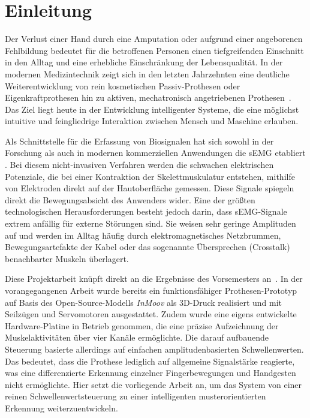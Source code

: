 \section{Einleitung}
\label{sec:einleitung}
Der Verlust einer Hand durch eine Amputation oder aufgrund einer angeborenen Fehlbildung bedeutet für die betroffenen Personen einen tiefgreifenden Einschnitt in den Alltag und eine erhebliche Einschränkung der Lebensqualität. In der modernen Medizintechnik zeigt sich in den letzten Jahrzehnten eine deutliche Weiterentwicklung von rein kosmetischen Passiv-Prothesen oder Eigenkraftprothesen hin zu aktiven, mechatronisch angetriebenen Prothesen~\cite{KellnerHandprothesen}. Das Ziel liegt heute in der Entwicklung intelligenter Systeme, die eine möglichst intuitive und feingliedrige Interaktion zwischen Mensch und Maschine erlauben.

Als Schnittstelle für die Erfassung von Biosignalen hat sich sowohl in der Forschung als auch in modernen kommerziellen Anwendungen die \ac{sEMG} etabliert \cite{geethanjali2016myoelectric, merletti2016surface,OttobockMyoPlus}. Bei diesem nicht-invasiven Verfahren werden die schwachen elektrischen Potenziale, die bei einer Kontraktion der Skelettmuskulatur entstehen, mithilfe von Elektroden direkt auf der Hautoberfläche gemessen. Diese Signale spiegeln direkt die Bewegungsabsicht des Anwenders wider. Eine der größten technologischen Herausforderungen besteht jedoch darin, dass \ac{sEMG}-Signale extrem anfällig für externe Störungen sind. Sie weisen sehr geringe Amplituden auf und werden im Alltag häufig durch elektromagnetisches Netzbrummen, Bewegungsartefakte der Kabel oder das sogenannte Übersprechen (Crosstalk) benachbarter Muskeln überlagert.

Diese Projektarbeit knüpft direkt an die Ergebnisse des Vorsemesters an~\cite{ZeitlerLaubhan2026}. In der vorangegangenen Arbeit wurde bereits ein funktionsfähiger Prothesen-Prototyp auf Basis des Open-Source-Modells \textit{InMoov} als 3D-Druck realisiert und mit Seilzügen und Servomotoren ausgestattet. Zudem wurde eine eigens entwickelte Hardware-Platine in Betrieb genommen, die eine präzise Aufzeichnung der Muskelaktivitäten über vier Kanäle ermöglichte. Die darauf aufbauende Steuerung basierte allerdings auf einfachen amplitudenbasierten Schwellenwerten. Das bedeutet, dass die Prothese lediglich auf allgemeine Signalstärke reagierte, was eine differenzierte Erkennung einzelner Fingerbewegungen und Handgesten nicht ermöglichte. Hier setzt die vorliegende Arbeit an, um das System von einer reinen Schwellenwertsteuerung zu einer intelligenten musterorientierten Erkennung weiterzuentwickeln.
